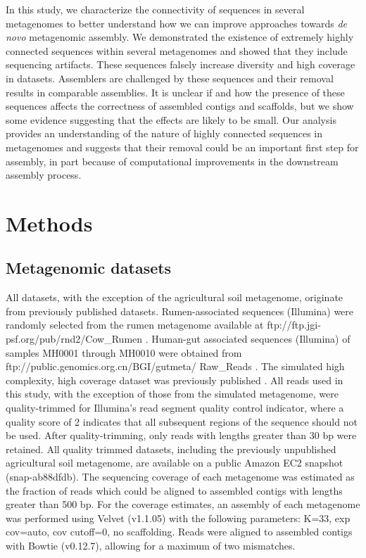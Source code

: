 \documentclass[10pt]{article}
\begin{document}
In this study, we characterize the connectivity of sequences in
several metagenomes to better understand how we can improve approaches
towards {\em de novo} metagenomic assembly.  We demonstrated the
existence of extremely highly connected sequences within several
metagenomes and showed that they include sequencing artifacts.  These
sequences falsely increase diversity and high coverage in datasets.
Assemblers are challenged by these sequences and their removal results
in comparable assemblies.  It is unclear if and how the presence of
these sequences affects the correctness of assembled contigs and
scaffolds, but we show some evidence suggesting that the effects are
likely to be small.  Our analysis provides an understanding of the
nature of highly connected sequences in metagenomes and suggests that
their removal could be an important first step for assembly, in part
because of computational improvements in the downstream assembly
process.

\section*{Methods}

\subsection*{Metagenomic datasets}
All datasets, with the exception of the agricultural soil metagenome,
originate from previously published datasets. Rumen-associated
sequences (Illumina) were randomly selected from the rumen metagenome
available at ftp://ftp.jgi-psf.org/pub/rnd2/Cow\_Rumen
\cite{Hess:2011p686}. Human-gut associated sequences (Illumina) of
samples MH0001 through MH0010 were obtained from
ftp://public.genomics.org.cn/BGI/gutmeta/ Raw\_Reads
\cite{Qin:2010p189}.  The simulated high complexity, high coverage
dataset was previously published \cite{Pignatelli:2011p742}.  All
reads used in this study, with the exception of those from the simulated
metagenome, were quality-trimmed for Illumina's read segment quality
control indicator, where a quality score of 2 indicates that all
subsequent regions of the sequence should not be used. After
quality-trimming, only reads with lengths greater than 30 bp were
retained. All quality trimmed datasets, including the previously
unpublished agricultural soil metagenome, are available on a public
Amazon EC2 snapshot (snap-ab88dfdb).  The sequencing coverage of each
metagenome was estimated as the fraction of reads which could be
aligned to assembled contigs with lengths greater than 500 bp.  For
the coverage estimates, an assembly of each metagenome was performed
using Velvet (v1.1.05) with the following parameters: K=33, exp
cov=auto, cov cutoff=0, no scaffolding.  Reads were aligned to
assembled contigs with Bowtie (v0.12.7), allowing for a maximum of two
mismatches.
\end{document}
